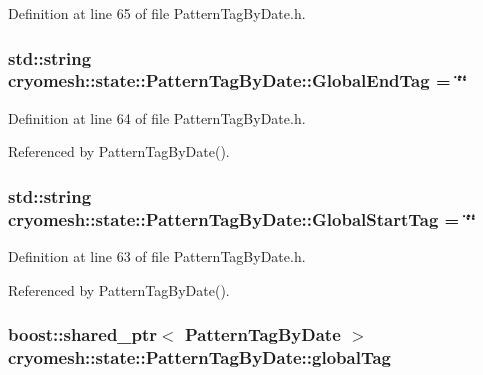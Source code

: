 \-Definition at line 65 of file \-Pattern\-Tag\-By\-Date.\-h.

\hypertarget{classcryomesh_1_1state_1_1PatternTagByDate_a3e16a76aea6ea2d84e8f90fb9a861a3d}{
\subsubsection[{\-Global\-End\-Tag}]{\setlength{\rightskip}{0pt plus 5cm}std\-::string {\bf cryomesh\-::state\-::\-Pattern\-Tag\-By\-Date\-::\-Global\-End\-Tag} = \char`\"{}\char`\"{}}}\label{classcryomesh_1_1state_1_1PatternTagByDate_a3e16a76aea6ea2d84e8f90fb9a861a3d}


\-Definition at line 64 of file \-Pattern\-Tag\-By\-Date.\-h.



\-Referenced by \-Pattern\-Tag\-By\-Date().

\hypertarget{classcryomesh_1_1state_1_1PatternTagByDate_add7aad1fe2fa9ba68a1f6efba392164b}{
\subsubsection[{\-Global\-Start\-Tag}]{\setlength{\rightskip}{0pt plus 5cm}std\-::string {\bf cryomesh\-::state\-::\-Pattern\-Tag\-By\-Date\-::\-Global\-Start\-Tag} = \char`\"{}\char`\"{}}}\label{classcryomesh_1_1state_1_1PatternTagByDate_add7aad1fe2fa9ba68a1f6efba392164b}


\-Definition at line 63 of file \-Pattern\-Tag\-By\-Date.\-h.



\-Referenced by \-Pattern\-Tag\-By\-Date().

\hypertarget{classcryomesh_1_1state_1_1PatternTagByDate_ac1d93cdd406b287fd3a008102e1d046c}{
\subsubsection[{global\-Tag}]{\setlength{\rightskip}{0pt plus 5cm}boost\-::shared\-\_\-ptr$<$ {\bf \-Pattern\-Tag\-By\-Date} $>$ {\bf cryomesh\-::state\-::\-Pattern\-Tag\-By\-Date\-::global\-Tag}}}\label{classcryomesh_1_1state_1_1PatternTagByDate_ac1d93cdd406b287fd3a008102e1d046c}


